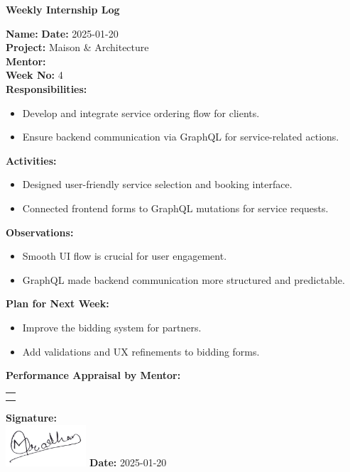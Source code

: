 \begin{center}
    \bfseries Weekly Internship Log
\end{center}

\noindent
\textbf{Name:}  \hfill \textbf{Date:} 2025-01-20 \\
\textbf{Project:} Maison \& Architecture \hfill \\
\textbf{Mentor:}  \\
\textbf{Week No:} 4 \\

\noindent
\textbf{Responsibilities:}
\begin{itemize}
    \item Develop and integrate service ordering flow for clients.
    \item Ensure backend communication via GraphQL for service-related actions.
\end{itemize}

\noindent
\textbf{Activities:}
\begin{itemize}
    \item Designed user-friendly service selection and booking interface.
    \item Connected frontend forms to GraphQL mutations for service requests.
\end{itemize}

\noindent
\textbf{Observations:}
\begin{itemize}
    \item Smooth UI flow is crucial for user engagement.
    \item GraphQL made backend communication more structured and predictable.
\end{itemize}

\noindent
\textbf{Plan for Next Week:}
\begin{itemize}
    \item Improve the bidding system for partners.
    \item Add validations and UX refinements to bidding forms.
\end{itemize}

\noindent
\textbf{Performance Appraisal by Mentor:} \\
\begin{table}[h]
    \centering
    \noindent
    \begin{tabularx}{\textwidth} { 
        | >{\centering\arraybackslash}X| }

        \hline
        \\ \\
        \hline
    \end{tabularx}
\end{table}

\vfill
\noindent
\textbf{Signature:} \\
\includegraphics[width=3cm]{assets/nirajpradhan-sign.png} \hfill \textbf{Date:} 2025-01-20
